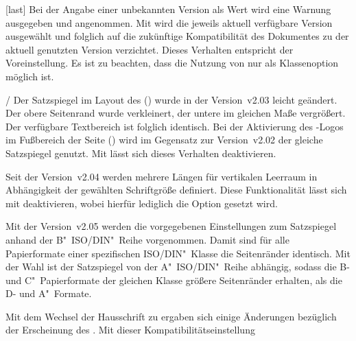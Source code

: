 \begin{Declaration}[v2.03]{}[last]
Bei der Angabe einer unbekannten Version als Wert wird eine Warnung ausgegeben 
und  angenommen. Mit  wird die 
jeweils aktuell verfügbare Version ausgewählt und folglich auf die zukünftige 
Kompatibilität des Dokumentes zu der aktuell genutzten Version verzichtet. 
Dieses Verhalten entspricht der Voreinstellung. Es ist zu beachten, dass die 
Nutzung von  nur als Klassenoption möglich ist.
%
\begin{values}{}
\item[\PValue{first}/\PValue{2.02}]
  Der Satzspiegel im Layout des \CDs () wurde in 
  der Version~v2.03 leicht geändert. Der obere Seitenrand wurde verkleinert, 
  der untere im gleichen Maße vergrößert. Der verfügbare Textbereich ist 
  folglich identisch. Bei der Aktivierung des \DDC-Logos im Fußbereich der 
  Seite () wird im Gegensatz zur Version~v2.02 der 
  gleiche Satzspiegel genutzt. Mit  lässt sich dieses 
  Verhalten deaktivieren.
\item[\PValue{2.03}]
  Seit der Version~v2.04 werden mehrere Längen für vertikalen Leerraum in 
  Abhängigkeit der gewählten Schriftgröße definiert. Diese Funktionalität lässt 
  sich mit  deaktivieren, wobei hierfür lediglich die 
  Option  gesetzt wird. 
\item[\PValue{2.04}]
  Mit der Version~v2.05 werden die vorgegebenen Einstellungen zum Satzspiegel 
  anhand der B"~ISO/DIN"~Reihe vorgenommen. Damit sind für alle Papierformate 
  einer spezifischen ISO/DIN"~Klasse die Seitenränder identisch. Mit der Wahl 
   ist der Satzspiegel von der A"~ISO/DIN"~Reihe 
  abhängig, sodass die B- und C"~Papierformate der gleichen Klasse größere 
  Seitenränder erhalten, als die D- und A"~Formate.
\item[\PValue{2.05}]
  Mit dem Wechsel der Hausschrift zu \OpenSans ergaben sich einige Änderungen 
  bezüglich der Erscheinung des \CDs. Mit dieser Kompatibilitätseinstellung 

\end{values}
\end{Declaration}
